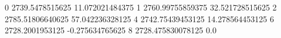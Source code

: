 0 2739.5478515625 11.072021484375
1 2760.99755859375 32.521728515625
2 2785.51806640625 57.042236328125
4 2742.75439453125 14.278564453125
6 2728.2001953125 -0.275634765625
8 2728.475830078125 0.0
